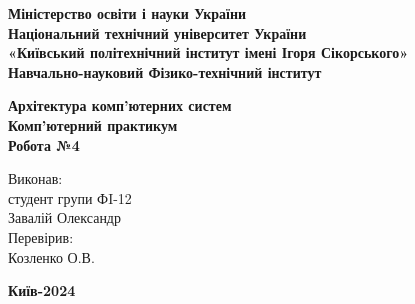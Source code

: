 \documentclass[a4paper,12pt]{article}
\begin{document}
    \pagestyle{fancy}
    \fancyhead{}
    \begin{center}
        \large{\textbf{Міністерство освіти і науки України\\
                Національний технічний університет України\\
                «Київський політехнічний інститут імені Ігоря Сікорського»\\
                Навчально-науковий Фізико-технічний інститут}}\\
        \hfill \break \hfill \break \hfill\break \hfill \break \hfill \break \hfill \break \hfill \break
        \hfill \break \hfill \break \hfill \break
        \begin{center}
            \normalsize{\textbf{Архітектура комп'ютерних систем\\
            Комп’ютерний практикум\\
            Робота №4}}
        \end{center}
    \end{center}
    \hfill \break \hfill \break \hfill \break \hfill \break \hfill \break \hfill \break \hfill \break
    \hfill \break \hfill \break \hfill \break \hfill \break 
    \begin{flushright}
        \large{ \hspace{35pt} Виконав:\\
            студент групи ФI-12\\
            Завалій Олександр\\} 
        \large{ \hspace{35pt} Перевірив:\\
        Козленко О.В.} 
    \end{flushright}
    \hfill \break \hfill \break \hfill \break \hfill \break \hfill \break \hfill \break \hfill \break
    \hfill \break
    \begin{center} \textbf{Київ-2024} \end{center}
    \thispagestyle{empty}
\end{document}

